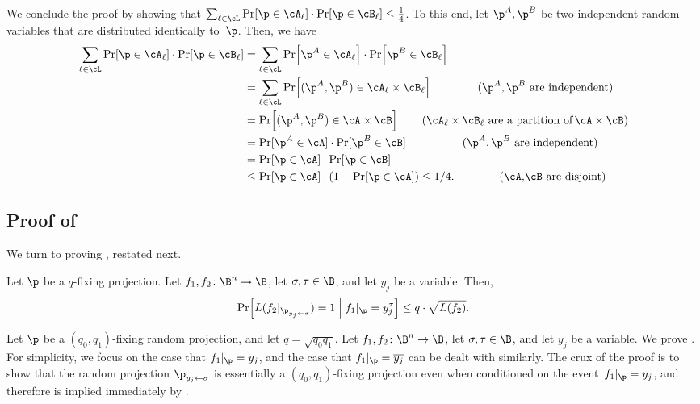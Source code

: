 We conclude the proof by showing that $\sum_{\ell\in\cL}\Pr\!\left[\p\in\cA_{\ell}\right]\cdot\Pr\!\left[\p\in\cB_{\ell}\right]\le\frac{1}{4}$.
To this end, let $\p^{A},\p^{B}$ be two independent random variables
that are distributed identically to~$\p$. Then, we have 
\begin{align*}  %
\sum_{\ell\in\cL}\Pr\!\left[\p\in\cA_{\ell}\right]\cdot\Pr\!\left[\p\in\cB_{\ell}\right] & =\sum_{\ell\in\cL}\Pr\!\left[\p^{A}\in\cA_{\ell}\right]\cdot\Pr\!\left[\p^{B}\in\cB_{\ell}\right]\\
 & =\sum_{\ell\in\cL}\Pr\!\left[(\p^{A},\p^{B})\in\cA_{\ell}\times\cB_{\ell}\right] %
\qquad\quad\ \ \ \text{(\ensuremath{\p^{A},\p^{B}} are independent)}\\  %
& =\Pr\!\left[(\p^{A},\p^{B})\in\cA\times\cB\right]
%
\qquad   %
 \text{(\ensuremath{\cA_{\ell}\times\cB_{\ell}} are a partition of\,\ensuremath{\cA\times\cB})}\\    %
 & =\Pr[\p^{A}\in\cA]\cdot\Pr[\p^{B}\in\cB] %
\qquad\qquad\quad \text{(\ensuremath{\p^{A},\p^{B}} are independent)}\\  %
 & =\Pr[\p\in\cA]\cdot\Pr[\p\in\cB]\\
 & \le\Pr[\p\in\cA]\cdot\left(1-\Pr[\p\in\cA]\right) 
%
\le 1/4.  %
%
\qquad\qquad \text{(\ensuremath{\cA},\ensuremath{\cB} are disjoint)}\\   %
\end{align*}
%
%

\subsection{\label{subsec:shrinkage-to-two-literals}Proof of }

We turn to proving , 
restated next.
\begin{restated}{}
Let $\p$ be a $q$-fixing projection. Let $f_{1},f_{2}\colon\B^{n}\to\B$,
let $\sigma,\tau\in\B$, and let $y_{j}$ be a variable. Then, 
\begin{equation}
\Pr\!\left[L(f_{2}|_{\p_{y_{j}\gets\sigma}})=1\;\middle|\;f_{1}|_{\p}=y_{j}^{\tau}\right]\le q\cdot\sqrt{L(f_{2})}.\label{eq:shrinkage-with-conditioning}
\end{equation}
\end{restated}

Let $\p$ be a $(q_{0},q_{1})$-fixing random projection, and let
$q=\sqrt{q_{0}q_{1}}$. Let $f_{1},f_{2}\colon\B^{n}\to\B$, let $\sigma,\tau\in\B$,
and let $y_{j}$ be a variable. We prove .
For simplicity, we focus on the case that $f_{1}|_{\p}=y_{j}$, and
the case that $f_{1}|_{\p}=\overline{y_{j}}$ can be dealt with similarly.
The crux of the proof is to show that the random projection $\p_{y_{j}\gets\sigma}$
is essentially a $(q_{0},q_{1})$-fixing projection even when conditioned
on the event~$f_{1}|_{\p}=y_{j}$, and therefore 
is implied immediately by .

